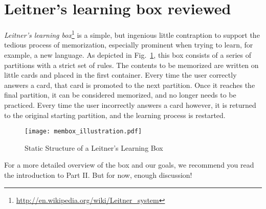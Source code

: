 \section{Leitner's learning box reviewed}

\emph{Leitner's learning box}\footnote{\href{http://en.wikipedia.org/wiki/Leitner\_system}{http://en.wikipedia.org/wiki/Leitner\_system}} is a simple, but
ingenious little contraption to support the tedious process of memorization, especially prominent when trying to learn, for example, a new language. As depicted
in Fig.~\ref{fig:membox_depiction}, this box consists of a series of partitions with a strict set of rules. The contents to be memorized are written on little
cards and placed in the first container. Every time the user correctly answers a card, that card is promoted to the next partition. Once it reaches the final
partition, it can be considered memorized, and no longer needs to be practiced. Every time the user incorrectly answers a card however, it is returned to the
original starting partition, and the learning process is restarted.

\begin{figure}[htbp]
	\centering
  \texttt{[image: membox\_illustration.pdf]}
	\caption{Static Structure of a Leitner's Learning Box}
	\label{fig:membox_depiction}
\end{figure}

For a more detailed overview of the box and our goals, we recommend you read the introduction to Part II. But for now, enough discussion!


